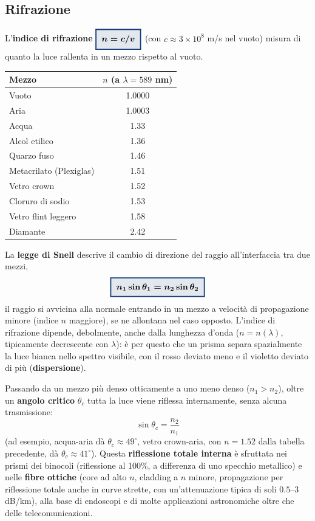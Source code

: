 \documentclass[a4paper,11pt]{article}
\newcommand{\keyeq}[1]{{\setlength{\fboxsep}{6pt}\setlength{\fboxrule}{1.3pt}\fcolorbox{chapblue}{chapblue!12}{\boldmath$\displaystyle #1$}}}
\begin{document}
\subsection{Rifrazione}

L'\textbf{indice di rifrazione} $\keyeq{n=c/v}$ (con $c\approx3\times10^8$ m/s nel vuoto) misura di quanto la luce rallenta in un mezzo rispetto al vuoto.

\begin{center}
\small
\begin{tabular}{lc}
\toprule
\textbf{Mezzo} & $n$ (a $\lambda=589$ nm) \\
\midrule
Vuoto & 1.0000 \\
Aria & 1.0003 \\
Acqua & 1.33 \\
Alcol etilico & 1.36 \\
Quarzo fuso & 1.46 \\
Metacrilato (Plexiglas) & 1.51 \\
Vetro crown & 1.52 \\
Cloruro di sodio & 1.53 \\
Vetro flint leggero & 1.58 \\
Diamante & 2.42 \\
\bottomrule
\end{tabular}
\end{center}

La \textbf{legge di Snell} descrive il cambio di direzione del raggio all'interfaccia tra due mezzi,
\[
\keyeq{n_1\sin\theta_1 = n_2\sin\theta_2}
\]
il raggio si avvicina alla normale entrando in un mezzo a velocità di propagazione minore (indice $n$ maggiore), se ne allontana nel caso opposto. L'indice di rifrazione dipende, debolmente, anche dalla lunghezza d'onda ($n=n(\lambda)$, tipicamente decrescente con $\lambda$): è per questo che un prisma separa spazialmente la luce bianca nello spettro visibile, con il rosso deviato meno e il violetto deviato di più (\textbf{dispersione}).

Passando da un mezzo più denso otticamente a uno meno denso ($n_1>n_2$), oltre un \textbf{angolo critico} $\theta_c$ tutta la luce viene riflessa internamente, senza alcuna trasmissione:
\[
\sin\theta_c = \frac{n_2}{n_1}
\]
(ad esempio, acqua-aria dà $\theta_c\approx49^{\circ}$, vetro crown-aria, con $n=1.52$ dalla tabella precedente, dà $\theta_c\approx41^{\circ}$). Questa \textbf{riflessione totale interna} è sfruttata nei prismi dei binocoli (riflessione al 100\%, a differenza di uno specchio metallico) e nelle \textbf{fibre ottiche} (core ad alto $n$, cladding a $n$ minore, propagazione per riflessione totale anche in curve strette, con un'attenuazione tipica di soli $0.5$--$3$ dB/km), alla base di endoscopi e di molte applicazioni astronomiche oltre che delle telecomunicazioni.
\end{document}
